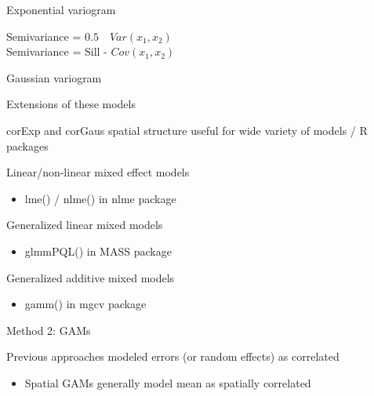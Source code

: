 \documentclass[
  ignorenonframetext,
]{beamer}
\providecommand{\tightlist}{%
  \setlength{\itemsep}{0pt}\setlength{\parskip}{0pt}}
\begin{document}
\begin{frame}{Exponential variogram}
\protect\hypertarget{exponential-variogram}{}

Semivariance = \(0.5 \quad Var({x}_{1},{x}_{2})\)\\
Semivariance = Sill - \(Cov({x}_{1},{x}_{2})\)

\end{frame}

\begin{frame}{Gaussian variogram}
\protect\hypertarget{gaussian-variogram}{}

\end{frame}

\begin{frame}{Extensions of these models}
\protect\hypertarget{extensions-of-these-models}{}

corExp and corGaus spatial structure useful for wide variety of models /
R packages

Linear/non-linear mixed effect models

\begin{itemize}
\tightlist
\item
  lme() / nlme() in nlme package
\end{itemize}

Generalized linear mixed models

\begin{itemize}
\tightlist
\item
  glmmPQL() in MASS package
\end{itemize}

Generalized additive mixed models

\begin{itemize}
\tightlist
\item
  gamm() in mgcv package
\end{itemize}

\end{frame}

\begin{frame}{Method 2: GAMs}
\protect\hypertarget{method-2-gams}{}

Previous approaches modeled errors (or random effects) as correlated

\begin{itemize}
\tightlist
\item
  Spatial GAMs generally model mean as spatially correlated
\end{itemize}

\end{frame}
\end{document}
